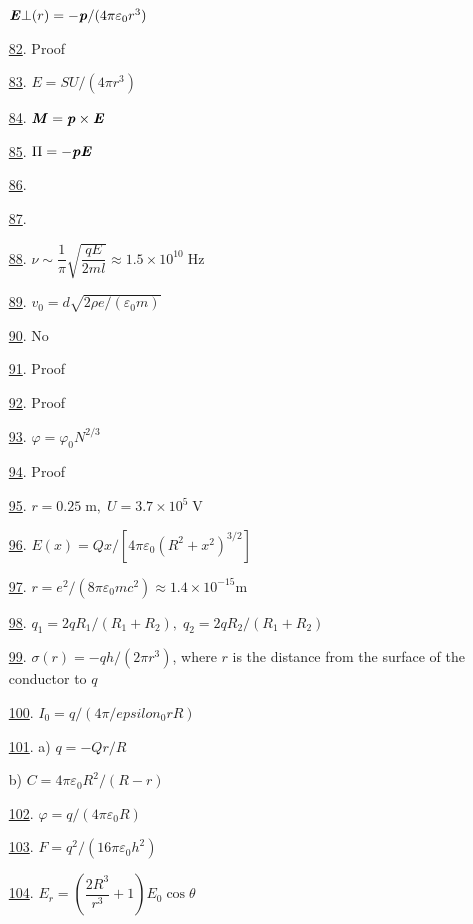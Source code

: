 \documentclass[11pt]{article}
\begin{document}
\begin{multicols}{2}
\begin{enumerate}
	$\textbf{\textit{E}}\bot(r)=-\textbf{\textit{p}}/(4\pi\varepsilon_0r^3)$ %
	\item [\hyperlink{P82}{82}.] Proof %
	\item [\hyperlink{P83}{83}.] $E=SU/(4\pi r^3)$ %
	\item [\hyperlink{P84}{84}.] $\textbf{\textit{M}}=\textbf{\textit{p}}\times\textbf{\textit{E}}$ %
	\item [\hyperlink{P85}{85}.] $\Pi=-\textbf{\textit{pE}}$ %
	\item [\hyperlink{P86}{86}.]  %
	\item [\hyperlink{P87}{87}.]  %
	\item [\hyperlink{P88}{88}.] $\nu\sim\dfrac{1}{\pi}\sqrt{\dfrac{qE}{2ml}}\approx1.5\times10^{10}\;\text{Hz}$ %
	\item [\hyperlink{P89}{89}.] $v_0=d\sqrt{2\rho e/(\varepsilon_0m)}$ %
	\item [\hyperlink{P90}{90}.] No %
	\item [\hyperlink{P91}{91}.] Proof %
	\item [\hyperlink{P92}{92}.] Proof %
	\item [\hyperlink{P93}{93}.] $\varphi=\varphi_0N^{2/3}$ %
	\item [\hyperlink{P94}{94}.] Proof %
	\item [\hyperlink{P95}{95}.] $r=0.25\;\text{m},\;U=3.7\times10^5\;\text{V}$ %
	\item [\hyperlink{P96}{96}.] $E(x)=Qx/\left[4\pi\varepsilon_0(R^2+x^2)^{3/2}\right]$ %
	\item [\hyperlink{P97}{97}.] $r=e^2/(8\pi\varepsilon_0mc^2)\approx1.4\times10^{-15}\text{m}$ %
	\item [\hyperlink{P98}{98}.] $q_1=2qR_1/(R_1+R_2),\;q_2=2qR_2/(R_1+R_2)$ %
	\item [\hyperlink{P99}{99}.] $\sigma(r)=-qh/(2\pi r^3)$, where $r$ is the distance from the surface of the conductor to $q$ %
	\item [\hyperlink{P100}{100}.] $I_0=q/(4\pi/epsilon_0rR)$ %
	\item [\hyperlink{P101}{101}.] a) $q=-Qr/R$
	
	b) $C=4\pi\varepsilon_0R^2/(R-r)$ %
	\item [\hyperlink{P102}{102}.] $\varphi=q/(4\pi\varepsilon_0R)$ %
	\item [\hyperlink{P103}{103}.] $F=q^2/(16\pi\varepsilon_0h^2)$ %
    \item [\hyperlink{P104}{104}.] $E_r=\left(\dfrac{2R^3}{r^3}+1\right)E_0\cos\theta$
	

\end{enumerate}
\end{multicols}
\end{document}
